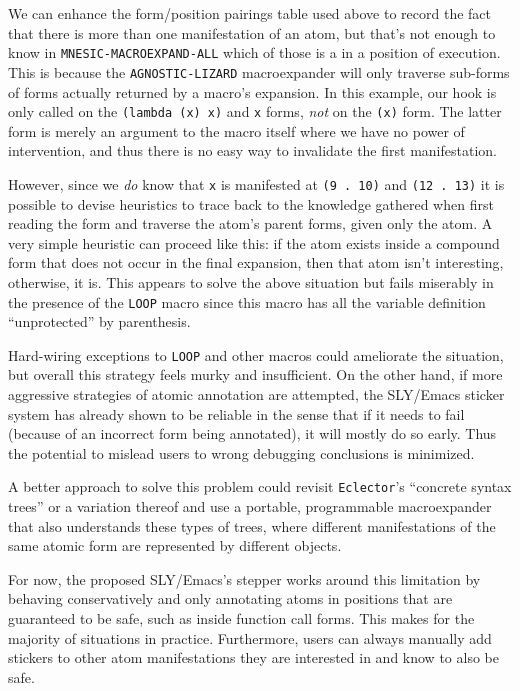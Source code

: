 \documentclass[sigconf]{acmart}
\begin{document}
We can enhance the form/position pairings table used above to record
the fact that there is more than one manifestation of an atom, but
that's not enough to know in \texttt{MNESIC-MACROEXPAND-ALL} which of
those is a in a position of execution.  This is because the
\texttt{AGNOSTIC-LIZARD} macroexpander will only traverse sub-forms of
forms actually returned by a macro's expansion.  In this example, our
hook is only called on the \texttt{(lambda (x) x)} and \texttt{x}
forms, \emph{not} on the \texttt{(x)} form.  The latter form is merely
an argument to the macro itself where we have no power of
intervention, and thus there is no easy way to invalidate the first
manifestation.

However, since we \emph{do} know that \texttt{x} is manifested at
\texttt{(9 . 10)} and \texttt{(12 . 13)} it is possible to devise
heuristics to trace back to the knowledge gathered when first reading
the form and traverse the atom's parent forms, given only the atom.  A
very simple heuristic can proceed like this: if the atom exists inside
a compound form that does not occur in the final expansion, then that
atom isn't interesting, otherwise, it is.  This appears to solve the
above situation but fails miserably in the presence of the
\texttt{LOOP} macro since this macro has all the variable definition
``unprotected'' by parenthesis.

Hard-wiring exceptions to \texttt{LOOP} and other macros could
ameliorate the situation, but overall this strategy feels murky and
insufficient.  On the other hand, if more aggressive strategies of
atomic annotation are attempted, the SLY/Emacs sticker system has
already shown to be reliable in the sense that if it needs to fail
(because of an incorrect form being annotated), it will mostly do so
early.  Thus the potential to mislead users to wrong debugging
conclusions is minimized.

A better approach to solve this problem could revisit
\texttt{Eclector}'s ``concrete syntax trees'' or a variation thereof
and use a portable, programmable macroexpander that also understands
these types of trees, where different manifestations of the same
atomic form are represented by different objects.

For now, the proposed SLY/Emacs's stepper works around this limitation
by behaving conservatively and only annotating atoms in positions that
are guaranteed to be safe, such as inside function call forms.  This
makes for the majority of situations in practice.  Furthermore, users
can always manually add stickers to other atom manifestations they are
interested in and know to also be safe.
\end{document}
